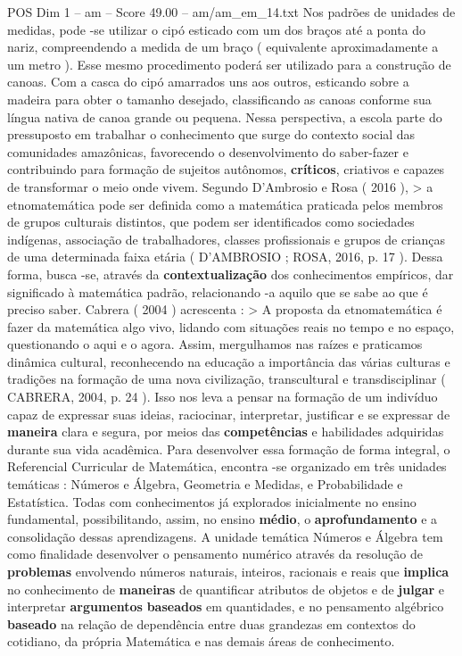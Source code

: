 \begin{textsample}{POS Dim 1 – am – Score 49.00 – am/am\_em\_14.txt}
Nos padrões de unidades de medidas, pode -se utilizar o cipó esticado com um dos braços até a ponta do nariz, compreendendo a medida de um braço ( equivalente aproximadamente a um metro ).
Esse mesmo procedimento poderá ser utilizado para a construção de canoas.
Com a casca do cipó amarrados uns aos outros, esticando sobre a madeira para obter o tamanho desejado, classificando as canoas conforme sua língua nativa de canoa grande ou pequena.
Nessa perspectiva, a escola parte do pressuposto em trabalhar o conhecimento que surge do contexto social das comunidades amazônicas, favorecendo o desenvolvimento do saber-fazer e contribuindo para formação de sujeitos autônomos, \textbf{críticos}, criativos e capazes de transformar o meio onde vivem.
Segundo D'Ambrosio e Rosa ( 2016 ), > a etnomatemática pode ser definida como a matemática praticada pelos membros de grupos culturais distintos, que podem ser identificados como sociedades indígenas, associação de trabalhadores, classes profissionais e grupos de crianças de uma determinada faixa etária ( D'AMBROSIO ; ROSA, 2016, p. 17 ).
Dessa forma, busca -se, através da \textbf{contextualização} dos conhecimentos empíricos, dar significado à matemática padrão, relacionando -a aquilo que se sabe ao que é preciso saber.
Cabrera ( 2004 ) acrescenta : > A proposta da etnomatemática é fazer da matemática algo vivo, lidando com situações reais no tempo e no espaço, questionando o aqui e o agora.
Assim, mergulhamos nas raízes e praticamos dinâmica cultural, reconhecendo na educação a importância das várias culturas e tradições na formação de uma nova civilização, transcultural e transdisciplinar ( CABRERA, 2004, p. 24 ).
Isso nos leva a pensar na formação de um indivíduo capaz de expressar suas ideias, raciocinar, interpretar, justificar e se expressar de \textbf{maneira} clara e segura, por meios das \textbf{competências} e habilidades adquiridas durante sua vida acadêmica.
Para desenvolver essa formação de forma integral, o Referencial Curricular de Matemática, encontra -se organizado em três unidades temáticas : Números e Álgebra, Geometria e Medidas, e Probabilidade e Estatística.
Todas com conhecimentos já explorados inicialmente no ensino fundamental, possibilitando, assim, no ensino \textbf{médio}, o \textbf{aprofundamento} e a consolidação dessas aprendizagens.
A unidade temática Números e Álgebra tem como finalidade desenvolver o pensamento numérico através da resolução de \textbf{problemas} envolvendo números naturais, inteiros, racionais e reais que \textbf{implica} no conhecimento de \textbf{maneiras} de quantificar atributos de objetos e de \textbf{julgar} e interpretar \textbf{argumentos} \textbf{baseados} em quantidades, e no pensamento algébrico \textbf{baseado} na relação de dependência entre duas grandezas em contextos do cotidiano, da própria Matemática e nas demais áreas de conhecimento.

\end{textsample}
